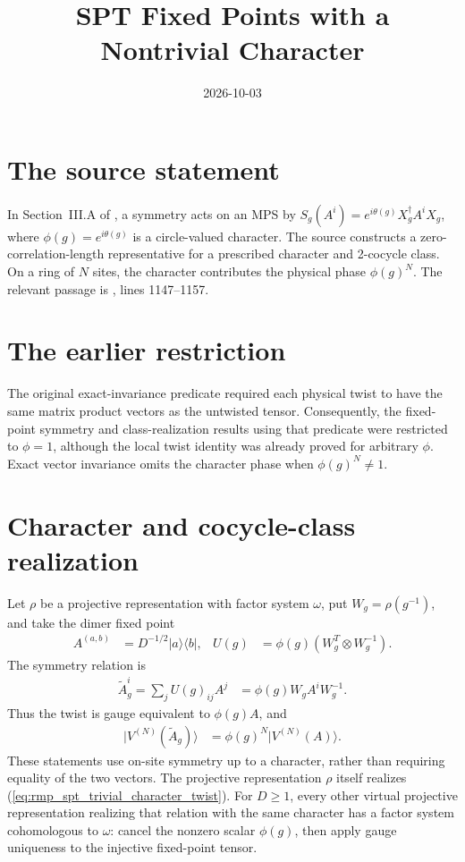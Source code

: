 \documentclass{article}
\title{SPT Fixed Points with a Nontrivial Character}
\author{}
\date{2026-10-03}
\begin{document}
\maketitle
{}

\section{The source statement}
In Section~III.A of \cite{Cirac2021Matrix}, a symmetry acts on an MPS by
$S_g(A^i)=e^{i\theta(g)}X_g^\dagger A^iX_g$, where
$\phi(g)=e^{i\theta(g)}$ is a circle-valued character. The source constructs
a zero-correlation-length representative for a prescribed character and
2-cocycle class. On a ring of $N$ sites, the character contributes the
physical phase $\phi(g)^N$. The relevant passage is
, lines 1147--1157.

\section{The earlier restriction}
The original exact-invariance predicate required each physical twist to
have the same matrix product vectors as the untwisted tensor. Consequently,
the fixed-point symmetry and class-realization results using that predicate
were restricted to $\phi=1$, although the local twist identity was already
proved for arbitrary $\phi$. Exact vector invariance omits the character
phase when $\phi(g)^N\ne1$.

\section{Character and cocycle-class realization}
Let $\rho$ be a projective representation with factor system $\omega$,
put $W_g=\rho(g^{-1})$, and take the dimer fixed point
\begin{align}
    A^{(a,b)} & =D^{-1/2}|a\rangle\langle b|, &
    U(g) & =\phi(g)(W_g^T\otimes W_g^{-1}).
    \label{eq:rmp_spt_character_action}
\end{align}
The symmetry relation is
\begin{align}
    \widetilde A_g^i=\sum_jU(g)_{ij}A^j
      & =\phi(g)W_gA^iW_g^{-1}.
    \label{eq:rmp_spt_trivial_character_twist}
\end{align}
Thus the twist is gauge equivalent to $\phi(g)A$, and
\begin{align}
    |V^{(N)}(\widetilde A_g)\rangle
      & =\phi(g)^N|V^{(N)}(A)\rangle.
    \label{eq:rmp_spt_character_vector}
\end{align}
These statements use on-site symmetry up to a character, rather than
requiring equality of the two vectors. The projective representation
$\rho$ itself realizes (\ref{eq:rmp_spt_trivial_character_twist}).
For $D\geq1$, every other virtual projective representation realizing
that relation with the same character has a factor system cohomologous
to $\omega$: cancel the nonzero scalar $\phi(g)$, then apply gauge
uniqueness to the injective fixed-point tensor.
\end{document}
